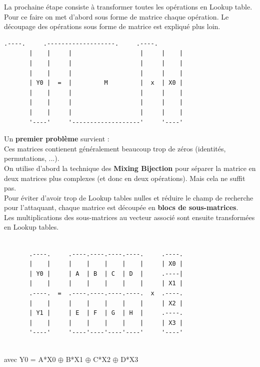 \documentclass[a4paper,12pt]{article}
\begin{document}
La prochaine étape consiste à transformer toutes les opérations en Lookup table. Pour ce faire on met d'abord sous forme de matrice chaque opération. Le découpage des opérations sous forme de matrice est expliqué plus loin.\\


\begin{Verbatim}[samepage=true]
       .----.     .-------------------.     .----.
       |    |     |                   |     |    |
       |    |     |                   |     |    |
       |    |     |                   |     |    |
       | Y0 |  =  |         M         |  x  | X0 |
       |    |     |                   |     |    |
       |    |     |                   |     |    |
       |    |     |                   |     |    |
       '----'     '-------------------'     '----'

\end{Verbatim}

Un \textbf{premier problème} survient :\\

Ces matrices contienent généralement beaucoup trop de zéros (identités, permutations, ...).\\
On utilise d'abord la technique des \textbf{Mixing Bijection} pour séparer la matrice en deux matrices plus complexes (et donc en deux opérations). Mais cela ne suffit pas.\\
Pour éviter d'avoir trop de Lookup tables nulles et réduire le champ de recherche pour l'attaquant, chaque matrice est découpée en \textbf{blocs de sous-matrices}.\\
Les multiplications des sous-matrices au vecteur associé sont ensuite transformées en Lookup tables.\\

\begin{Verbatim}[samepage=true]

       .----.     .----.----.----.----.     .----.
       |    |     |    |    |    |    |     | X0 |
       | Y0 |     | A  | B  | C  | D  |     .----|
       |    |     |    |    |    |    |     | X1 |
       .----.  =  .----.----.----.----.  x  .----.
       |    |     |    |    |    |    |     | X2 |
       | Y1 |     | E  | F  | G  | H  |     .----.
       |    |     |    |    |    |    |     | X3 |
       '----'     '----'----'----'----'     '----'
           
\end{Verbatim}

avec Y0 = A*X0 $\oplus$ B*X1 $\oplus$ C*X2 $\oplus$ D*X3
\end{document}
